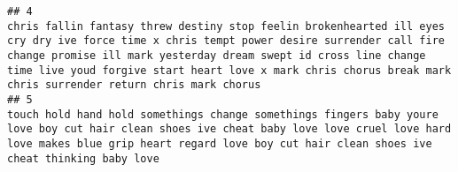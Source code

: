\documentclass[]{article}
\begin{document}
\begin{verbatim}
## 4                                                                                                                                                                                                                                                                                                                                                                                                                                                                                                                                                                                                                                                                                                                                                                                                                                                                                                           chris fallin fantasy threw destiny stop feelin brokenhearted ill eyes cry dry ive force time x chris tempt power desire surrender call fire change promise ill mark yesterday dream swept id cross line change time live youd forgive start heart love x mark chris chorus break mark chris surrender return chris mark chorus
## 5                                                                                                                                                                                                                                                                                                                                                                                                                                                                                                                                                                                                                                                                                                                                                                                                                                                                                                                                                                                                 touch hold hand hold somethings change somethings fingers baby youre love boy cut hair clean shoes ive cheat baby love love cruel love hard love makes blue grip heart regard love boy cut hair clean shoes ive cheat thinking baby love

\end{verbatim}
\end{document}
